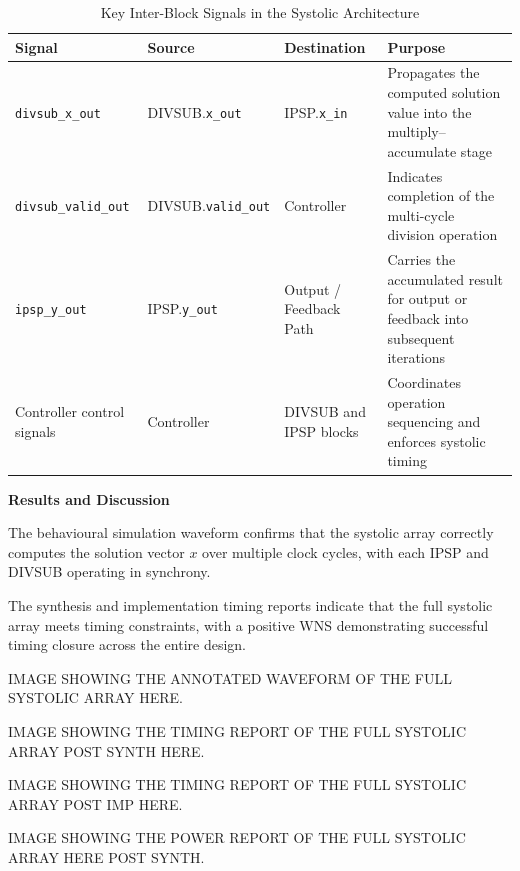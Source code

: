 \documentclass[a4paper,12pt]{article}
\begin{document}
\begin{table}[h!]
\centering
\caption{Key Inter-Block Signals in the Systolic Architecture}
\begin{tabular}{p{3.5cm} p{3.5cm} p{2.7cm} p{3.5cm}}
\hline
\textbf{Signal} & \textbf{Source} & \textbf{Destination} & \textbf{Purpose} \\
\hline
\texttt{divsub\_x\_out} &
DIVSUB.\texttt{x\_out} &
IPSP.\texttt{x\_in} &
Propagates the computed solution value into the multiply--accumulate stage \\
\hline
\texttt{divsub\_valid\_out} &
DIVSUB.\texttt{valid\_out} &
Controller &
Indicates completion of the multi-cycle division operation \\
\hline
\texttt{ipsp\_y\_out} &
IPSP.\texttt{y\_out} &
Output / Feedback Path &
Carries the accumulated result for output or feedback into subsequent iterations \\
\hline
Controller control signals &
Controller &
DIVSUB and IPSP blocks &
Coordinates operation sequencing and enforces systolic timing \\
\hline
\end{tabular}
\end{table}


\textbf{Results and Discussion}

The behavioural simulation waveform confirms that the systolic array correctly computes the solution vector $x$ over multiple clock cycles, with each IPSP and DIVSUB operating in synchrony.

The synthesis and implementation timing reports indicate that the full systolic array meets timing constraints, with a positive WNS demonstrating successful timing closure across the entire design.

\begin{large}
    IMAGE SHOWING THE ANNOTATED WAVEFORM OF THE FULL SYSTOLIC ARRAY HERE.
\end{large}

\begin{large}
    IMAGE SHOWING THE TIMING REPORT OF THE FULL SYSTOLIC ARRAY POST SYNTH HERE.
\end{large}

\begin{large}
    IMAGE SHOWING THE TIMING REPORT OF THE FULL SYSTOLIC ARRAY POST IMP HERE.
\end{large}

\begin{large}
    IMAGE SHOWING THE POWER REPORT OF THE FULL SYSTOLIC ARRAY HERE POST SYNTH.
\end{large}
\end{document}
